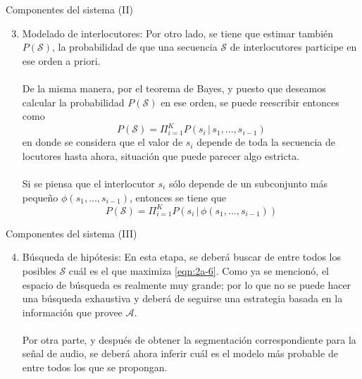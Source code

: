 \begin{frame}{Componentes del sistema (II)}
  \begin{enumerate}
    \setcounter{enumi}{2}
    \item \alert{Modelado de interlocutores:}
    Por otro lado, se tiene que estimar también $P(\mathcal{S})$, la probabilidad de que una secuencia $\mathcal{S}$ de interlocutores participe en ese orden a priori. 
    \\~\\
    De la misma manera, por el teorema de Bayes, y puesto que deseamos calcular la probabilidad $P(\mathcal{S})$ en ese orden, se puede reescribir entonces como
    \begin{equation}
      P(\mathcal{S}) = \Pi_{i=1}^K P(s_i \,|\, s_1, ..., s_{i-1})
      \label{eqn:2a-7}
    \end{equation}
    en donde se considera que el valor de $s_i$ depende de toda la secuencia de locutores hasta ahora, situación que puede parecer algo estricta.
    \\~\\
    Si se piensa que el interlocutor $s_i$ sólo depende de un subconjunto más pequeño $\phi(s_1, ..., s_{i-1})$, entonces se tiene que 
    \begin{equation}
      P(\mathcal{S}) = \Pi_{i=1}^K P(s_i \,|\, \phi(s_1, ..., s_{i-1}))
      \label{eqn:2a-8}
    \end{equation}
  \end{enumerate}
\end{frame}

\begin{frame}{Componentes del sistema (III)}
  \begin{enumerate}
    \setcounter{enumi}{3}  
    \item \alert{Búsqueda de hipótesis:}
    En esta etapa, se deberá buscar de entre todos los posibles $\mathcal{S}$ cuál es el que maximiza \eqref{eqn:2a-6}. Como ya se mencionó, el espacio de búsqueda es realmente muy grande; por lo que no se puede hacer una búsqueda exhaustiva y deberá de seguirse una estrategia basada en la información que provee $\mathcal{A}$.
    \\~\\
    Por otra parte, y después de obtener la segmentación correspondiente para la señal de audio, se deberá ahora inferir cuál es el modelo más probable de entre todos los que se propongan. %
  \end{enumerate}
\end{frame}

